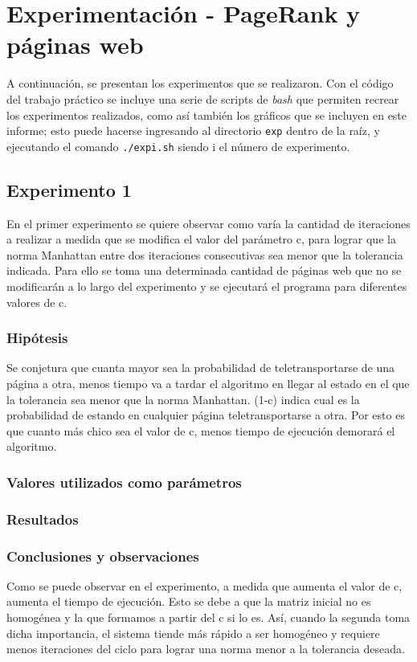 \section{Experimentación - PageRank y páginas web}
	A continuación, se presentan los experimentos que se realizaron. Con el código del trabajo práctico se incluye una serie de scripts de \emph{bash} que permiten recrear los experimentos realizados, como así también los gráficos que se incluyen en este informe; esto puede hacerse ingresando al directorio \texttt{exp} dentro de la raíz, y ejecutando el comando \texttt{./expi.sh} siendo i el número de experimento.

	\subsection{Experimento 1}
	En el primer experimento se quiere observar como varía la cantidad de iteraciones a realizar a medida que se modifica el valor del parámetro c, para lograr que la norma Manhattan entre dos iteraciones consecutivas sea menor que la tolerancia indicada. Para ello se toma una determinada cantidad de páginas web que no se modificarán a lo largo del experimento y se ejecutará el programa para diferentes valores de c. 

		\subsubsection*{Hipótesis} 
		Se conjetura que cuanta mayor sea la probabilidad de teletransportarse de una página a otra, menos tiempo va a tardar el algoritmo en llegar al estado en el que la tolerancia sea menor que la norma Manhattan. (1-c) indica cual es la probabilidad de estando en cualquier página teletransportarse a otra. Por esto es que cuanto más chico sea el valor de c, menos tiempo de ejecución demorará el algoritmo.

		\subsubsection*{Valores utilizados como parámetros} 


		\subsubsection*{Resultados}

		\subsubsection*{Conclusiones y observaciones} 
		Como se puede observar en el experimento, a medida que aumenta el valor de c, aumenta el tiempo de ejecución. Esto se debe a que la matriz inicial no es homogénea y la que formamos a partir del c si lo es. Así, cuando la segunda toma dicha importancia, el sistema tiende más rápido a ser homogéneo y requiere menos iteraciones del ciclo para lograr una norma menor a la tolerancia deseada. 



